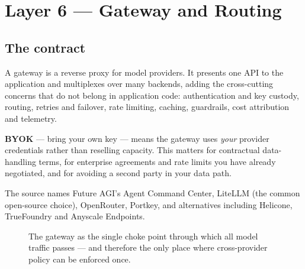 \documentclass[11pt,twoside,openright]{book}
\theoremstyle{definition}
\theoremstyle{plain}
\theoremstyle{remark}
\newcommand{\term}[1]{\textbf{#1}}
\begin{document}
\cleardoublepage

\chapter{Layer 6 --- Gateway and Routing}
\label{ch:gateway}

\section{The contract}

A gateway is a reverse proxy for model providers. It presents one API to the
application and multiplexes over many backends, adding the cross-cutting
concerns that do not belong in application code: authentication and key custody,
routing, retries and failover, rate limiting, caching, guardrails, cost
attribution and telemetry.

\term{BYOK} --- bring your own key --- means the gateway uses \emph{your}
provider credentials rather than reselling capacity. This matters for
contractual data-handling terms, for enterprise agreements and rate limits you
have already negotiated, and for avoiding a second party in your data path.

The source names Future AGI's Agent Command Center, LiteLLM (the common
open-source choice), OpenRouter, Portkey, and alternatives including Helicone,
TrueFoundry and Anyscale Endpoints.

\begin{figure}[H]
\centering
{}
\caption{The gateway as the single choke point through which all model traffic
passes --- and therefore the only place where cross-provider policy can be
enforced once.}
\end{figure}
\end{document}
